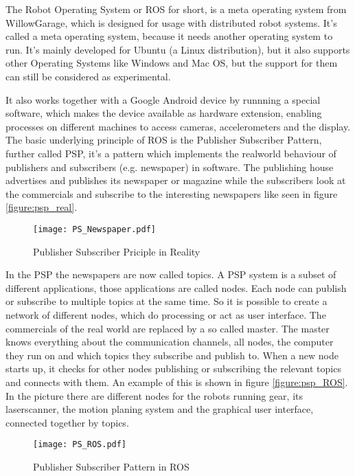 The Robot Operating System or ROS for short, is a meta operating system from WillowGarage, which is designed for usage with distributed 
robot systems. It's called a meta operating system, because it needs another operating system to run. It's mainly developed for Ubuntu 
(a Linux distribution), but it also supports other Operating Systems like Windows and Mac OS, but the support for them can still be considered 
as experimental. 

It also works together with a Google Android device by runnning a special software, which makes the device available
as hardware extension, enabling processes on different machines to access cameras, accelerometers and the display.
The basic underlying principle of ROS is the Publisher Subscriber Pattern, further called PSP, it's a pattern which 
implements the realworld behaviour of publishers and subscribers (e.g. newspaper) in software. 
The publishing house advertises and publishes its newspaper or magazine while the subscribers look at the commercials
and subscribe to the interesting newspapers like seen in figure \vref{figure:psp_real}.

\begin{figure}[htp]
	\centering
	\texttt{[image: PS\_Newspaper.pdf]}
	\caption{Publisher Subscriber Priciple in Reality}
	\label{figure:psp_real}
\end{figure} 


In the PSP the newspapers are now called topics. A PSP system is a subset of different applications, those applications are called nodes.  
Each node can publish or subscribe to multiple topics at the same time. So it is possible to create a network of different nodes, which
do processing or act as user interface. The commercials of the real world are replaced by a so called master. 
The master knows everything about the communication channels, all nodes, the computer they run on and 
which topics they subscribe and publish to. When a new node starts up, it checks for other nodes publishing or subscribing the relevant topics
and connects with them. An example of this is shown in figure \vref{figure:psp_ROS}.
In the picture there are different nodes for the robots running gear, its laserscanner, the motion planing system and the graphical user interface,
connected together by topics.

\begin{figure}[htp]
	\centering
	\texttt{[image: PS\_ROS.pdf]}
	\caption{Publisher Subscriber Pattern in ROS}
	\label{figure:psp_ROS}
\end{figure} 

